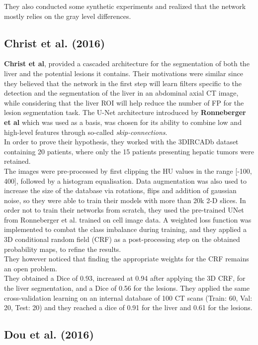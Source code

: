They also conducted some synthetic experiments and realized that the
network mostly relies on the gray level differences.

\subsection{Christ et al. (2016)}\label{christ-et-al.-2016}

\textbf{Christ et al}, provided a cascaded architecture for the
segmentation of both the liver and the potential lesions it contains.
Their motivations were similar since they believed that the network in
the first step will learn filters specific to the detection and the
segmentation of the liver in an abdominal axial CT image, while
considering that the liver ROI will help reduce the number of FP for the
lesion segmentation task. The U-Net architecture introduced by
\textbf{Ronneberger et al} which was used as a basis, was chosen for its
ability to combine low and high-level features through so-called
\emph{skip-connections}. \\
In order to prove their hypothesis, they worked with the 3DIRCADb
dataset containing 20 patients, where only the 15 patients presenting
hepatic tumors were retained. \\
The images were pre-processed by first clipping the HU values in the
range {[}-100, 400{]}, followed by a histogram equalisation. Data
augmentation was also used to increase the size of the database via
rotations, flips and addition of gaussian noise, so they were able to
train their models with more than 20k 2-D slices. In order not to train
their networks from scratch, they used the pre-trained UNet from
Ronneberger et al. trained on cell image data. A weighted loss function
was implemented to combat the class imbalance during training, and they
applied a 3D conditional random field (CRF) as a post-processing step on
the obtained probability maps, to refine the results.\\
They however noticed that finding the appropriate weights for the CRF
remains an open problem.\\
They obtained a Dice of 0.93, increased at 0.94 after applying the 3D
CRF, for the liver segmentation, and a Dice of 0.56 for the lesions.
They applied the same cross-validation learning on an internal database
of 100 CT scans (Train: 60, Val: 20, Test: 20) and they reached a dice
of 0.91 for the liver and 0.61 for the lesions.

\subsection{Dou et al. (2016)}\label{dou-et-al.-2016}

